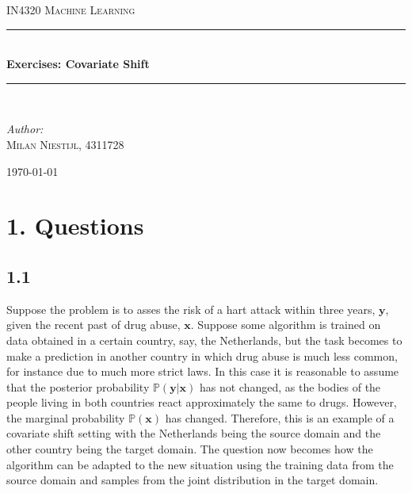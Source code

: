 \documentclass [a4paper] {report}
\begin{document}
	
	\begin{titlepage}
		\begin{center}
			
			\textsc{\LARGE IN4320 Machine Learning}\\[1.25cm]
			
			\rule{\linewidth}{0.5mm}\\[1.0cm]
			{\huge \bfseries Exercises: Covariate Shift }\\[0.6cm]
			\rule{\linewidth}{0.5mm}\\[1.5cm]
			
			\begin{minipage}{0.4\textwidth}
				\begin{flushleft} \large	
					\emph{Author:}\\
					\textsc{Milan Niestijl, 4311728}
				\end{flushleft}
			\end{minipage}
			
			\vfill
			{\large \today}
		\end{center}
	\end{titlepage}
	
	\section*{1. Questions}
	
	\subsection*{1.1}
	Suppose the problem is to asses the risk of a hart attack within three years, $\mathbf{y}$, given the recent past of drug abuse, $\mathbf{x}$. Suppose some algorithm is trained on data obtained in a certain country, say, the Netherlands, but the task becomes to make a prediction in another country in which drug abuse is much less common, for instance due to much more strict laws. In this case it is reasonable to assume that the posterior probability $\mathbb{P}(\mathbf{y}|\mathbf{x})$ has not changed, as the bodies of the people living in both countries react approximately the same to drugs. However, the marginal probability $\mathbb{P}(\mathbf{x})$ has changed. Therefore, this is an example of a covariate shift setting with the Netherlands being the source domain and the other country being the target domain. The question now becomes how the algorithm can be adapted to the new situation using the training data from the source domain and samples from the joint distribution in the target domain.
	
\end{document}

